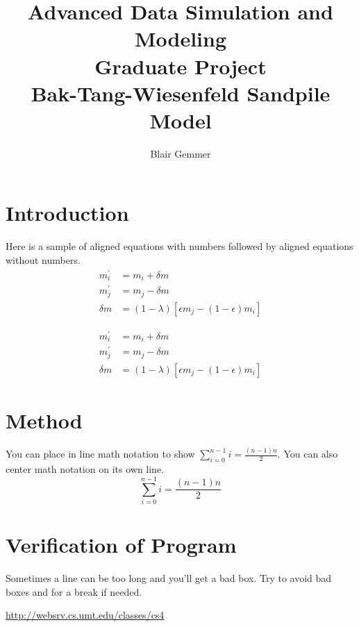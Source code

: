 \documentclass{article}%
\begin{document}
\title{Advanced Data Simulation and Modeling\\Graduate Project\\Bak-Tang-Wiesenfeld Sandpile Model}
\author{Blair Gemmer}
\maketitle

\twocolumn

\section{Introduction}
Here is a sample of aligned equations with numbers followed by aligned equations without numbers.
\begin{align}
  m^{\prime}_i&= m_i + \delta m\\
  m^{\prime}_j&= m_j - \delta m\\
  \delta m &= (1 - \lambda)[\epsilon m_j - (1 - \epsilon)m_i]
\end{align}

\begin{align*}
  m^{\prime}_i&= m_i + \delta m\\
  m^{\prime}_j&= m_j - \delta m\\
  \delta m &= (1 - \lambda)[\epsilon m_j - (1 - \epsilon)m_i]
\end{align*}

\section{Method}
You can place in line math notation to show $\sum^{n-1}_{i=0}{i} = \frac{(n-1)n}{2}$. You can also center math notation on its own line.
$$\sum^{n-1}_{i=0}{i} = \frac{(n-1)n}{2}$$

\section{Verification of Program}
Sometimes a line can be too long and you'll get a bad box. Try to avoid bad boxes and for a break if needed.

\noindent\url{http://websrv.cs.umt.edu/classes/cs4}
\end{document}
